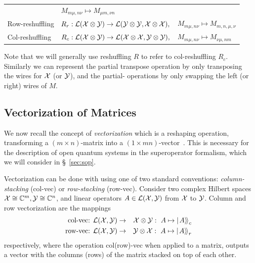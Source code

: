 \begin{fullpage}
\begin{center}
\begin{tabular}{lll}
\quad&\quad	$M_{m\mu,n\nu} \mapsto M_{\mu m, \nu n}$
\\
Row-reshuffling
\quad&\quad	$R_r: {\mathcal L}({\cal X}\otimes{\cal Y})\rightarrow {\mathcal L}({\cal Y}\otimes{\cal Y},{\cal X}\otimes{\cal X}),$ 
\quad&\quad	$M_{m\mu,n\nu} \mapsto M_{m, n , \mu, \nu} $
\\
Col-reshuffling
\quad&\quad	$R_c: {\mathcal L}({\cal X}\otimes{\cal Y})\rightarrow {\mathcal L}({\cal X}\otimes{\cal X},{\cal Y}\otimes{\cal Y}),$ 
\quad&\quad	$M_{m\mu,n\nu} \mapsto M_{\nu \mu, n m}$
\end{tabular}
\end{center}
%
Note that we will generally use reshuffling $R$ to refer to col-reshuffling $R_c$. Similarly we can represent the partial transpose operation by only transposing the wires for ${\cal X}$ (or ${\cal Y}$), and the partial-\SWAP{} operations by only swapping the left (or right) wires of $M$.\\
\end{fullpage}

\subsection{Vectorization of Matrices}
\label{sec:vec}
We now recall the concept of \emph{vectorization} which is a reshaping operation, transforming a $(m\times n)$-matrix into a $(1\times mn)$-vector~\cite{Horn1985}. This is necessary for the description of open quantum systems in the superoperator formalism, which we will consider in \S~\ref{sec:sop}.
\begin{definition}
Vectorization can be done with using one of two standard conventions: \emph{column-stacking} (col-vec) or \emph{row-stacking} (row-vec). Consider two complex Hilbert spaces ${\cal X}\cong {\mathbb C}^m, {\cal Y}\cong {\mathbb C}^n$, and linear operators  $A\in {\mathcal L}({\cal X},{\cal Y})$ from ${\cal X}$ to ${\cal Y}$. Column and row vectorization are the mappings
\begin{eqnarray}
\mbox{col-vec: } {\mathcal L}({\cal X},{\cal Y})&\rightarrow& \mathcal{X}\otimes\mathcal{Y}: \,\, A\mapsto\mbox{$\left|\left.A\right\rangle\!\right\rangle$}_c\\
\mbox{row-vec: } {\mathcal L}({\cal X},{\cal Y})&\rightarrow& \mathcal{Y}\otimes\mathcal{X}: \,\,A\mapsto\mbox{$\left|\left.A\right\rangle\!\right\rangle$}_r
\end{eqnarray} 
respectively, where the operation col(row)-vec when applied to a matrix, outputs a vector with the columns (rows) of the matrix stacked on top of each other. 
\end{definition}



